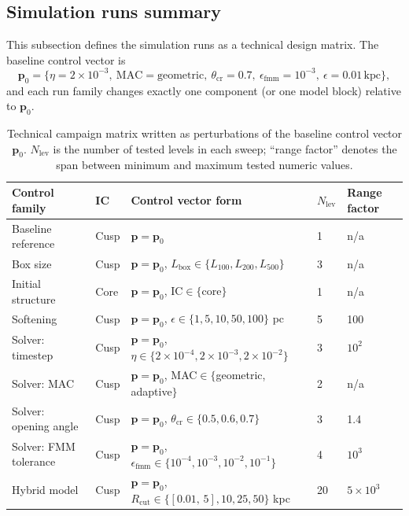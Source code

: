 \subsection{Simulation runs summary}
\label{sec:framework_simulation_summary}

This subsection defines the simulation runs as a technical design matrix. The baseline control vector is
\begin{equation}
\mathbf{p}_0 = \{\eta=2\times10^{-3},\ \mathrm{MAC}=\mathrm{geometric},\ \theta_{\mathrm{cr}}=0.7,\ \epsilon_{\mathrm{fmm}}=10^{-3},\ \epsilon=0.01\,\mathrm{kpc}\},
\end{equation}
and each run family changes exactly one component (or one model block) relative to $\mathbf{p}_0$.

\begin{table}[H]
\centering
\small
\caption{Technical campaign matrix written as perturbations of the baseline control vector $\mathbf{p}_0$. $N_{\mathrm{lev}}$ is the number of tested levels in each sweep; ``range factor'' denotes the span between minimum and maximum tested numeric values.}
\label{tab:simulation_campaign_summary}
{\renewcommand{\arraystretch}{1.2}
\begin{tabular}{p{} p{} p{} p{} p{}}
\hline
\textbf{Control family} & \textbf{IC} & \textbf{Control vector form} & \textbf{$N_{\mathrm{lev}}$} & \textbf{Range factor} \\
\hline
Baseline reference & Cusp & $\mathbf{p}=\mathbf{p}_0$ & 1 & n/a \\

Box size & Cusp & $\mathbf{p}=\mathbf{p}_0$, $L_{\mathrm{box}}\in\{L_{\mathrm{100}},L_{\mathrm{200}},L_{\mathrm{500}}\}$ & 3 & n/a \\

Initial structure & Core & $\mathbf{p}=\mathbf{p}_0$, IC$\in\{$core$\}$ & 1 & n/a \\

Softening & Cusp & $\mathbf{p}=\mathbf{p}_0$, $\epsilon\in\{1,5,10,50,100\}$ pc & 5 & 100 \\

Solver: timestep & Cusp & $\mathbf{p}=\mathbf{p}_0$, $\eta\in\{2\times10^{-4},2\times10^{-3},2\times10^{-2}\}$ & 3 & $10^2$ \\

Solver: MAC & Cusp & $\mathbf{p}=\mathbf{p}_0$, MAC$\in\{$geometric, adaptive$\}$ & 2 & n/a \\

Solver: opening angle & Cusp & $\mathbf{p}=\mathbf{p}_0$, $\theta_{\mathrm{cr}}\in\{0.5,0.6,0.7\}$ & 3 & 1.4 \\

Solver: FMM tolerance & Cusp & $\mathbf{p}=\mathbf{p}_0$, $\epsilon_{\mathrm{fmm}}\in\{10^{-4},10^{-3},10^{-2},10^{-1}\}$ & 4 & $10^3$ \\

Hybrid model & Cusp & $\mathbf{p}=\mathbf{p}_0$, $R_{\mathrm{cut}}\in\{[0.01,\,5],10,25,50\}$ kpc & 20 & $5 \times 10^3$ \\
\hline
\end{tabular}
}
\end{table}

